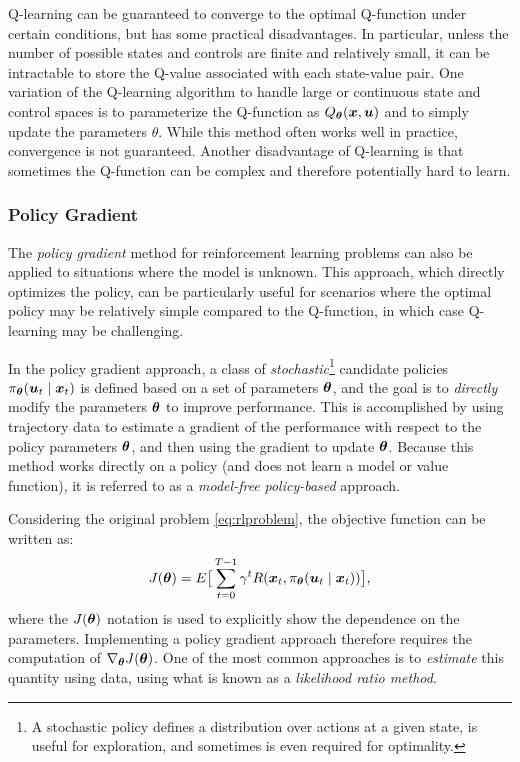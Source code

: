 Q-learning can be guaranteed to converge to the optimal Q-function under certain conditions, but has some practical disadvantages. In particular, unless the number of possible states and controls are finite and relatively small, it can be intractable to store the Q-value associated with each state-value pair. One variation of the Q-learning algorithm to handle large or continuous state  and control spaces is to parameterize the Q-function as $Q_{\bm{\theta}}(\bm{x}, \bm{u})$ and to simply update the parameters $\theta$. While this method often works well in practice, convergence is not guaranteed. Another disadvantage of Q-learning is that sometimes the Q-function can be complex and therefore potentially hard to learn.

\subsubsection{Policy Gradient}
The \textit{policy gradient} method for reinforcement learning problems can also be applied to situations where the model is unknown. This approach, which directly optimizes the policy, can be particularly useful for scenarios where the optimal policy may be relatively simple compared to the Q-function, in which case Q-learning may be challenging. 

In the policy gradient approach, a class of \textit{stochastic}\footnote{A stochastic policy defines a distribution over actions at a given state, is useful for exploration, and sometimes is even required for optimality.} candidate policies $\pi_{\bm{\theta}}(\bm{u}_t \mid \bm{x}_t)$ is defined based on a set of parameters $\bm{\theta}$, and the goal is to \textit{directly} modify the parameters $\bm{\theta}$ to improve performance. This is accomplished by using trajectory data to estimate a gradient of the performance with respect to the policy parameters $\bm{\theta}$, and then using the gradient to update $\bm{\theta}$. Because this method works directly on a policy (and does not learn a model or value function), it is referred to as a \textit{model-free} \textit{policy-based} approach.

Considering the original problem \eqref{eq:rlproblem}, the objective function can be written as:
\begin{equation*}
    J(\bm{\theta}) = E\big[\sum_{t=0}^{T-1} \gamma^tR(\bm{x}_t, \pi_{\bm{\theta}}(\bm{u}_t \mid \bm{x}_t))\big],
\end{equation*}
where the $J(\bm{\theta})$ notation is used to explicitly show the dependence on the parameters. Implementing a policy gradient approach therefore requires the computation of $\nabla_{\bm{\theta}} J(\bm{\theta})$. One of the most common approaches is to \textit{estimate} this quantity using data, using what is known as a \textit{likelihood ratio method}.

